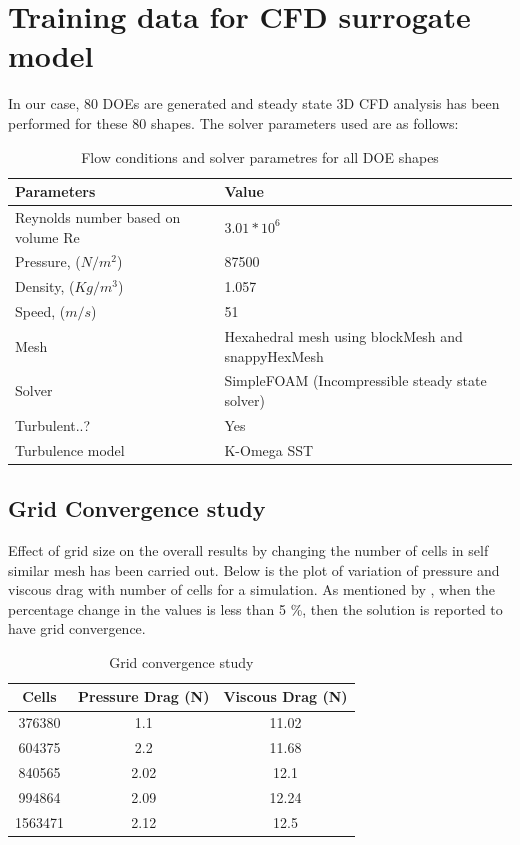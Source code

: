 \chapter{Training data for CFD surrogate model}
\label{Training data CFD}
In our case, 80 DOEs are generated and steady state 3D CFD analysis has been performed for these 80 shapes. The solver parameters used are as follows:
\begin{table}[H]
	\caption{Flow conditions and solver parametres for all DOE shapes}
	\label{Flow conditions and solver parametres for all DOE shapes}
	\centering
	\begin{tabular}{ll}
		\hline \hline
		Parameters & Value \\ 
		\hline \hline
		Reynolds number based on volume Re & $ 3.01 \ast 10^6 $ \\
		Pressure, ($ N/m^2 $) & 87500 \\
		Density, ($ Kg/m^3 $) & 1.057 \\
		Speed, ($ m/s $) & 51 \\
		Mesh & Hexahedral mesh using blockMesh and snappyHexMesh \\
		Solver & SimpleFOAM (Incompressible steady state solver) \\
		Turbulent..? & Yes \\
		Turbulence model & K-Omega SST \\
		\hline \hline
	\end{tabular}
\end{table}
\section{Grid Convergence study}

Effect of grid size on the overall results by  changing the number of cells in self similar mesh has been carried out. Below is the plot of variation of pressure and viscous drag with number of cells for a simulation. As mentioned by \cite{Suman2011} , when the percentage change in the values is less than 5 \%, then the solution is reported to have grid convergence.

\begin{table}[H]
	\caption{Grid convergence study}
	\label{Grid convergence table}
	\centering
	\begin{tabular}{ccc}
		\hline \hline
		Cells & Pressure Drag (N) & Viscous Drag (N) \\
		\hline \hline
		376380 & 1.1  & 11.02 \\
		604375  & 2.2  & 11.68 \\
		840565  & 2.02  & 12.1 \\
		994864  & 2.09  & 12.24 \\
		1563471  & 2.12 & 12.5 \\
		\hline \hline
	\end{tabular}
\end{table}

